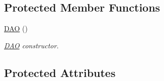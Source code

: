 \subsection*{Protected Member Functions}
\begin{DoxyCompactItemize}
\item 
\hyperlink{classdatabase_1_1DAO_acb47f8f2c2185ebede743cc5fd6d3449}{D\-A\-O} ()
\begin{DoxyCompactList}\small\item\em \hyperlink{classdatabase_1_1DAO}{D\-A\-O} constructor. \end{DoxyCompactList}\end{DoxyCompactItemize}
\subsection*{Protected Attributes}
